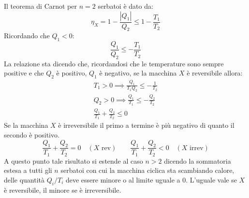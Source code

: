\documentclass[10pt,a4paper]{book}
\begin{document}
\FloatBarrier
Il teorema di Carnot per $n=2$ serbatoi è dato da:
\[
	\eta_X = 1 - \frac{|Q_1|}{Q_2 } \le 1 - \frac{T_1 }{T_2 }
\]
Ricordando che $Q_1<0$:
\[
	\frac{Q_1 }{Q_2 } \le - \frac{T_1 }{T_2 }
\]
La relazione sta dicendo che, ricordandosi che le temperature sono sempre positive e che $Q_2$ è positivo, $Q_1$ è negativo, se la macchina $X$ è reversibile allora:
\begin{gather*}
	T_1>0 \implies \frac{Q_1 }{T_1 Q_2} \le - \frac{1}{T_2} \\
	Q_2>0 \implies \frac{Q_1 }{T_1 } \le - \frac{Q_2 }{T_2 } \\
	\frac{Q_1 }{T_1} + \frac{Q_2 }{T_2 } \le 0
\end{gather*}
Se la macchina $X$ è irreversibile il primo a termine è più negativo di quanto il secondo è positivo.
\[
	\frac{Q_1 }{T_1} + \frac{Q_2 }{T_2 } = 0 \quad (X\text{ rev} ) \qquad \frac{Q_1 }{T_1} + \frac{Q_2 }{T_2 } < 0 \quad (X\text{ irrev} )
\]
A questo punto tale risultato si estende al caso $n>2$ dicendo la sommatoria estesa a tutti gli $n$ serbatoi con cui la macchina ciclica sta scambiando calore, delle quantità $Q_i/T_i$ deve essere minore o al limite uguale a $0$. L'uguale vale se $X$ è reversibile, il minore se è irreversibile.
\end{document}
